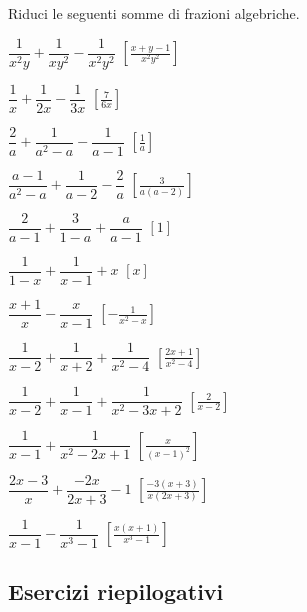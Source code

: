 \begin{esercizio}[\Ast]
\label{ese:19.28}
Riduci le seguenti somme di frazioni algebriche.
\begin{multicols}{2}
\begin{enumeratea}
 \item \(\dfrac{1}{x^{2}y}+\dfrac{1}{xy^{2}}-\dfrac{1}{x^{2}y^{2}}\)
  \hfill \(\left[\frac{x+y-1}{x^{2}y^{2}}\right]\)
 \item \(\dfrac{1}{x}+\dfrac{1}{2x}-\dfrac{1}{3x}\)
  \hfill \(\left[\frac{7}{6x}\right]\)
 \item \(\dfrac{2}{a}+\dfrac{1}{a^{{2}}-a}-\dfrac{1}{a-1}\)
  \hfill \(\left[\frac{1}{a}\right]\)
 \item \(\dfrac{a-1}{a^{2}-a}+\dfrac{1}{a-2}-\dfrac{2}{a}\)
  \hfill \(\left[\frac{3}{a(a-2)}\right]\)
 \item \(\dfrac{2}{a-1}+\dfrac{3}{1-a}+\dfrac{a}{a-1}\)
  \hfill \(\left[1\right]\)
 \item \(\dfrac{1}{1-x}+\dfrac{1}{x-1}+x\)
  \hfill \(\left[x\right]\)
 \item \(\dfrac{x+1}{x}-\dfrac{x}{x-1}\)
  \hfill \(\left[-{\frac{1}{x^{2}-x}}\right]\)
 \item \(\dfrac{1}{x-2}+\dfrac{1}{x+2}+\dfrac{1}{x^{{2}}-4}\)
  \hfill \(\left[\frac{2x+1}{x^{2}-4}\right]\)
 \item \(\dfrac{1}{x-2}+\dfrac{1}{x-1}+\dfrac{1}{x^{{2}}-3x+2}\)
  \hfill \(\left[\frac{2}{x-2}\right]\)
 \item \(\dfrac{1}{x-1}+\dfrac{1}{x^{2}-2x+1}\)
  \hfill \(\left[\frac{x}{(x-1)^{2}}\right]\)
 \item \(\dfrac{2x-3}{x}+\dfrac{-2x}{2x+3}-1\)
  \hfill \(\left[\frac{-3(x+3)}{x(2x+3)}\right]\)
 \item \(\dfrac{1}{x-1}-\dfrac{1}{x^{3}-1}\)
  \hfill \(\left[\frac{x(x+1)}{x^{3}-1}\right]\)
\end{enumeratea}
\end{multicols}
\end{esercizio}

\newpage %

\subsection*{Esercizi riepilogativi}

